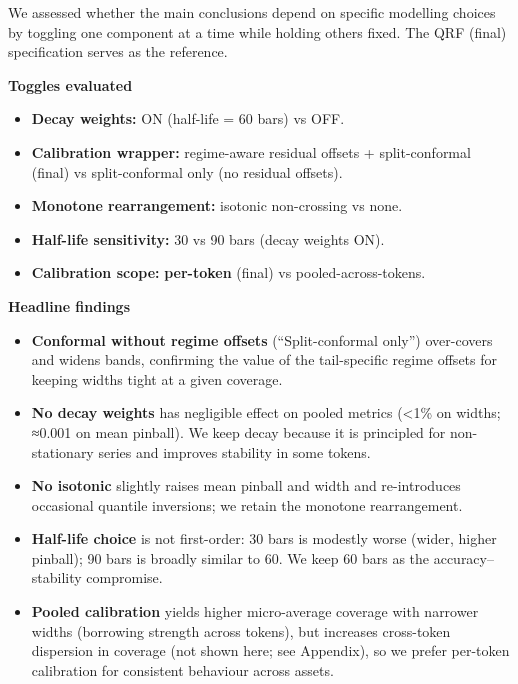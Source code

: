 \documentclass[
  a4paper,
  DIV=11,
  numbers=noendperiod]{scrreprt}
\providecommand{\tightlist}{%
  \setlength{\itemsep}{0pt}\setlength{\parskip}{0pt}}
\begin{document}
We assessed whether the main conclusions depend on specific modelling
choices by toggling one component at a time while holding others fixed.
The QRF (final) specification serves as the reference.

\textbf{Toggles evaluated}

\begin{itemize}
\tightlist
\item
  \textbf{Decay weights:} ON (half-life = 60 bars) vs OFF.
\item
  \textbf{Calibration wrapper:} regime-aware residual offsets +
  split-conformal (final) vs split-conformal only (no residual offsets).
\item
  \textbf{Monotone rearrangement:} isotonic non-crossing vs none.
\item
  \textbf{Half-life sensitivity:} 30 vs 90 bars (decay weights ON).
\item
  \textbf{Calibration scope:} \textbf{per-token} (final) vs
  pooled-across-tokens.
\end{itemize}

\textbf{Headline findings}

\begin{itemize}
\tightlist
\item
  \textbf{Conformal without regime offsets} (``Split-conformal only'')
  over-covers and widens bands, confirming the value of the
  tail-specific regime offsets for keeping widths tight at a given
  coverage.
\item
  \textbf{No decay weights} has negligible effect on pooled metrics
  (\textless1\% on widths; ≈0.001 on mean pinball). We keep decay
  because it is principled for non-stationary series and improves
  stability in some tokens.
\item
  \textbf{No isotonic} slightly raises mean pinball and width and
  re-introduces occasional quantile inversions; we retain the monotone
  rearrangement.
\item
  \textbf{Half-life choice} is not first-order: 30 bars is modestly
  worse (wider, higher pinball); 90 bars is broadly similar to 60. We
  keep 60 bars as the accuracy--stability compromise.
\item
  \textbf{Pooled calibration} yields higher micro-average coverage with
  narrower widths (borrowing strength across tokens), but increases
  cross-token dispersion in coverage (not shown here; see Appendix), so
  we prefer per-token calibration for consistent behaviour across
  assets.
\end{itemize}
\end{document}
